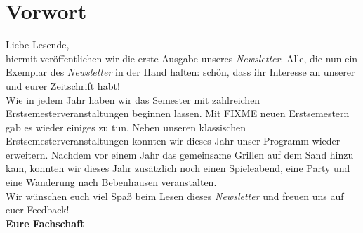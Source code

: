\section{Vorwort}
\Large
Liebe Lesende,\\

\normalsize
hiermit veröffentlichen wir die erste Ausgabe unseres \textit{Newsletter}. Alle, die nun ein Exemplar des \textit{Newsletter} in der Hand halten: schön, dass ihr Interesse an unserer und eurer Zeitschrift habt! \\

Wie in jedem Jahr haben wir das Semester mit zahlreichen Erstsemesterveranstaltungen beginnen lassen. Mit FIXME neuen Erstsemestern gab es wieder einiges zu tun.
Neben unseren klassischen Erstsemesterveranstaltungen konnten wir dieses Jahr unser Programm wieder erweitern. Nachdem vor einem Jahr das gemeinsame Grillen auf dem Sand hinzu kam, konnten wir dieses Jahr zusätzlich noch einen Spieleabend, eine Party und eine Wanderung nach Bebenhausen veranstalten.\\

Wir wünschen euch viel Spaß beim Lesen dieses \textit{Newsletter} und freuen uns auf euer Feedback!\\

\large
\textbf{Eure Fachschaft}
\normalsize